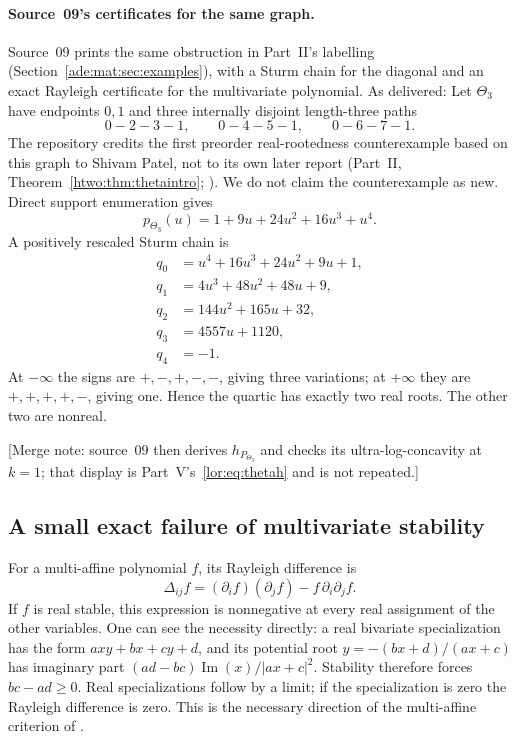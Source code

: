 \documentclass[11pt]{article}
\numberwithin{equation}{section}
\theoremstyle{definition}
\newcommand{\im}{\operatorname{Im}}
\begin{document}
\paragraph{Source~09's certificates for the same graph.}
Source~09 prints the same obstruction in Part~II's labelling
(Section~\ref{ade:mat:sec:examples}), with a Sturm chain for the diagonal
and an exact Rayleigh certificate for the multivariate polynomial. As
delivered:
Let $\Theta_3$ have endpoints $0,1$ and three internally disjoint
length-three paths
\[
 0-2-3-1,\qquad0-4-5-1,\qquad0-6-7-1.
\]
The repository credits the first preorder real-rootedness counterexample
based on this graph to Shivam Patel, not to its own later report
(Part~II, Theorem~\ref{htwo:thm:thetaintro}; \cite{Patel}). We do not claim the counterexample as new.
Direct support enumeration gives
\begin{equation}
 p_{\Theta_3}(u)=1+9u+24u^2+16u^3+u^4.
\label{ade:mat:eq:theta-p}
\end{equation}
A positively rescaled Sturm chain is
\begin{align*}
 q_0&=u^4+16u^3+24u^2+9u+1,\\
 q_1&=4u^3+48u^2+48u+9,\\
 q_2&=144u^2+165u+32,\\
 q_3&=4557u+1120,\\
 q_4&=-1.
\end{align*}
At $-\infty$ the signs are $+,-,+,-,-$, giving three variations; at
$+\infty$ they are $+,+,+,+,-$, giving one. Hence the quartic has exactly
two real roots. The other two are nonreal.

[Merge note: source~09 then derives $h_{P_{\Theta_3}}$ and checks its
ultra-log-concavity at $k=1$; that display is Part~V's~\eqref{lor:eq:thetah}
and is not repeated.]
\subsection{A small exact failure of multivariate stability}
For a multi-affine polynomial $f$, its Rayleigh difference is
\[
 \Delta_{ij}f=(\partial_i f)(\partial_j f)-f\,\partial_i\partial_j f.
\]
If $f$ is real stable, this expression is nonnegative at every real
assignment of the other variables. One can see the necessity directly:
a real bivariate specialization has the form
$a xy+b x+c y+d$, and its potential root
$y=-(bx+d)/(ax+c)$ has imaginary part
$(ad-bc)\im(x)/|ax+c|^2$. Stability therefore forces
$bc-ad\geq0$. Real specializations follow by a limit; if the specialization
is zero the Rayleigh difference is zero. This is the necessary direction
of the multi-affine criterion of \cite{Branden}.
\end{document}
